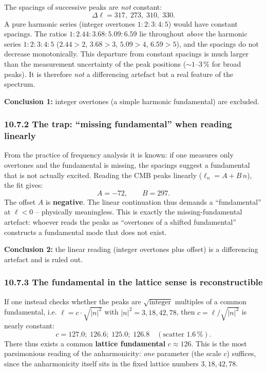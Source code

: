 The spacings of successive peaks are \emph{not} constant:
\[
  \Delta\ell = 317,\; 273,\; 310,\; 330.
\]
A pure harmonic series (integer overtones $1:2:3:4:5$)
would have constant spacings. The ratios $1:2{.}44:3{.}68:5{.}09:6{.}59$
lie throughout \emph{above} the harmonic series $1:2:3:4:5$ ($2.44>2$,
$3.68>3$, $5.09>4$, $6.59>5$), and the spacings do not decrease
monotonically. This departure from constant spacings is much larger than
the measurement uncertainty of the peak positions ($\sim 1$--$3\,\%$ for
broad peaks). It is therefore \emph{not} a differencing artefact but a real
feature of the spectrum.

\textbf{Conclusion 1:} integer overtones (a simple harmonic
fundamental) are excluded.

\subsubsection*{10.7.2 The trap: ``missing fundamental'' when reading linearly}

From the practice of frequency analysis it is known: if one measures
only overtones and the fundamental is missing, the spacings suggest a
fundamental that is not actually excited. Reading the CMB peaks
linearly ($\ell_n = A + B\,n$), the fit gives:
\[
  A = -72, \qquad B = 297.
\]
The offset $A$ is \textbf{negative}. The linear continuation thus
demands a ``fundamental'' at $\ell < 0$ -- physically meaningless.
This is exactly the missing-fundamental artefact: whoever reads the
peaks as ``overtones of a shifted fundamental'' constructs a
fundamental mode that does not exist.

\textbf{Conclusion 2:} the linear reading (integer overtones plus
offset) is a differencing artefact and is ruled out.

\subsubsection*{10.7.3 The fundamental in the lattice sense is reconstructible}

If one instead checks whether the peaks are
$\sqrt{\text{integer}}$ multiples of a common fundamental, i.e.
$\ell = c\cdot\sqrt{|n|^2}$ with $|n|^2 = 3, 18, 42, 78$, then
$c = \ell/\sqrt{|n|^2}$ is nearly constant:
\[
  c = 127{.}0;\; 126{.}6;\; 125{.}0;\; 126{.}8
  \quad(\text{scatter } 1{.}6\,\%).
\]
There thus exists a common \textbf{lattice fundamental}
$c \approx 126$. This is the most parsimonious reading of the
anharmonicity: \emph{one} parameter (the scale $c$) suffices, since the
anharmonicity itself sits in the fixed lattice numbers $3, 18, 42, 78$.

